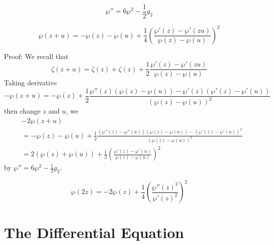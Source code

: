 \documentclass[12pt, oneside]{book}
\begin{document}
\begin{theorem}
    \begin{equation*}
        \wp'' = 6 \wp^2 - \frac{1}{2} g_2
    \end{equation*}
\end{theorem}
\begin{theorem}
    \[
        \wp(z+u) = -\wp (z) - \wp(u) + \frac{1}{4}\left(\frac{\wp'(z)-\wp'(zu)}{\wp(z)-\wp(u)}\right)^2
    \]

    Proof:
    We recall that
    \[
        \zeta(z+u)=\zeta(z)+ \zeta(z) + \frac{1}{2}\frac{\wp'(z)-\wp'(zu)}{\wp(z)-\wp(u)}
    \]
    Taking derivative
    \[
        -\wp(z+u) = -\wp(z) + \frac{1}{2} \frac{\wp''(z)(\wp(z)-\wp(u))-\wp'(z)(\wp'(z)-\wp'(u))}{\left(\wp(z)-\wp(u)\right)^2}
    \]
    then change $z$ and $u$, we
    \[
        \begin{aligned}
             & -2\wp(z+u)                                                                                                                                       \\
             & = -\wp(z)-\wp(u) + \frac{1}{2} \frac{\left(\wp''(z)-\wp''(u)\right)(\wp(z)-\wp(u))-\left(\wp'(z)-\wp'(u)\right)^2}{\left(\wp(z)-\wp(u)\right)^2} \\
             & = 2\left(\wp(z)+\wp(u)\right)
            +
            \frac{1}{2} \left(\frac{\wp'(z)-\wp'(u)}{\wp(z)-\wp(u)}\right)^2
        \end{aligned}
    \]
    by $\wp'' = 6 \wp^2 - \frac{1}{2} g_2$.

\end{theorem}
\begin{corollary}
    \[
        \wp(2z) = - 2\wp(z) + \frac{1}{4} \left(\frac{\wp''(z)^2}{\wp'(z)^2}\right)^2
    \]
\end{corollary}

\section{The Differential Equation}
\end{document}
